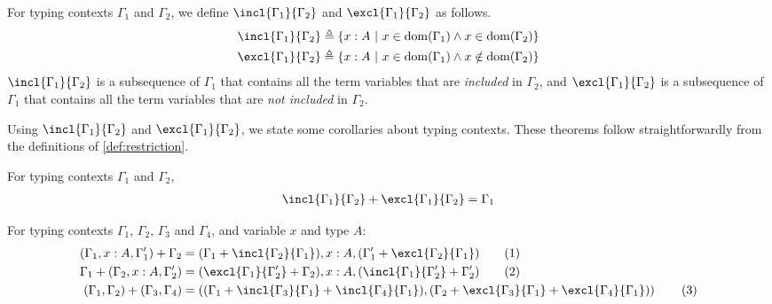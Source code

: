 \begin{definition}
\label{def:restriction}
For typing contexts $\Gamma_1$ and $\Gamma_2$, we define $\incl{\Gamma_1}{\Gamma_2}$ and $\excl{\Gamma_1}{\Gamma_2}$ as follows.
\begin{align*}
\incl{\Gamma_1}{\Gamma_2} &\triangleq \{ x:A\ |\ x \in \mathrm{dom}(\Gamma_1) \land x \in \mathrm{dom}(\Gamma_2)\}\\
\excl{\Gamma_1}{\Gamma_2} &\triangleq \{ x:A\ |\ x \in \mathrm{dom}(\Gamma_1) \land x \notin \mathrm{dom}(\Gamma_2)\}
\end{align*}
$\incl{\Gamma_1}{\Gamma_2}$ is a subsequence of $\Gamma_1$ that contains all the term variables that are \emph{included} in $\Gamma_2$, and
$\excl{\Gamma_1}{\Gamma_2}$ is a subsequence of $\Gamma_1$ that contains all the term variables that are \emph{not included} in $\Gamma_2$.
\end{definition}

Using $\incl{\Gamma_1}{\Gamma_2}$ and $\excl{\Gamma_1}{\Gamma_2}$, we state some corollaries about typing contexts.
These theorems follow straightforwardly from the definitions of \ref{def:restriction}.

\begin{lemma}
\label{lemma:restriction}
For typing contexts $\Gamma_1$ and $\Gamma_2$,
\begin{align*}
    \incl{\Gamma_1}{\Gamma_2} + \excl{\Gamma_1}{\Gamma_2} = \Gamma_1
\end{align*}
\end{lemma}


\begin{lemma}
\label{lemma:shuffle}
For typing contexts $\Gamma_1$, $\Gamma_2$, $\Gamma_3$ and $\Gamma_4$, and variable $x$ and type $A$:
\begin{align*}
(\Gamma_1,x:A,\Gamma'_1)+\Gamma_2 &= (\Gamma_1 + \incl{\Gamma_2}{\Gamma_1}),x:A,(\Gamma_1' + \excl{\Gamma_2}{\Gamma_1}) \tag{1}\\
\Gamma_1 + (\Gamma_2,x:A,\Gamma'_2) &= (\excl{\Gamma_1}{\Gamma'_2} + \Gamma_2),x:A,(\incl{\Gamma_1}{\Gamma'_2} + \Gamma'_2) \tag{2}\\
(\Gamma_1,\Gamma_2)+(\Gamma_3,\Gamma_4) &= \left((\Gamma_1+\incl{\Gamma_3}{\Gamma_1}+\incl{\Gamma_4}{\Gamma_1}), (\Gamma_2+\excl{\Gamma_3}{\Gamma_1}+\excl{\Gamma_4}{\Gamma_1})\right) \tag{3}
\end{align*}
\end{lemma}

